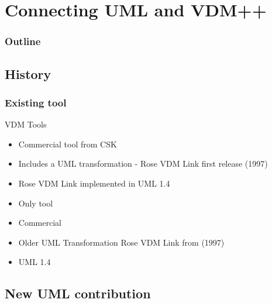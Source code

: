 %
%
\section{Connecting UML and VDM++}
%
%
\begin{frame}
  \frametitle{Outline}
  \tableofcontents[current]
\end{frame}


\subsection{History}
%
%
\frame
{
  \frametitle{Existing tool}

VDM Tools
  \begin{itemize}
  		\item Commercial tool from CSK
  		\item Includes a UML transformation - Rose VDM Link first release (1997)
  		\item Rose VDM Link implemented in UML 1.4
	  	
  \end{itemize}


}


\note
{

  \begin{itemize}
  		\item Only tool
  		\item Commercial
  		\item Older UML Transformation Rose VDM Link from (1997)
  		\item UML 1.4
	  	
  \end{itemize}




}


\subsection{New UML contribution}

